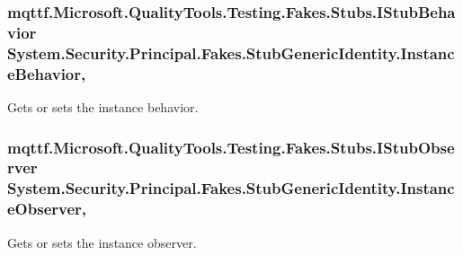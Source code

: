 \hypertarget{class_system_1_1_security_1_1_principal_1_1_fakes_1_1_stub_generic_identity_aebfe31f6715669121785a6d5a100efd6}{
\subsubsection[{Instance\-Behavior}]{\setlength{\rightskip}{0pt plus 5cm}mqttf.\-Microsoft.\-Quality\-Tools.\-Testing.\-Fakes.\-Stubs.\-I\-Stub\-Behavior System.\-Security.\-Principal.\-Fakes.\-Stub\-Generic\-Identity.\-Instance\-Behavior\hspace{0.3cm}{\ttfamily [get]}, {\ttfamily [set]}}}\label{class_system_1_1_security_1_1_principal_1_1_fakes_1_1_stub_generic_identity_aebfe31f6715669121785a6d5a100efd6}


Gets or sets the instance behavior.

\hypertarget{class_system_1_1_security_1_1_principal_1_1_fakes_1_1_stub_generic_identity_a7b144995e36a4b344bdf80cd566a4c0b}{
\subsubsection[{Instance\-Observer}]{\setlength{\rightskip}{0pt plus 5cm}mqttf.\-Microsoft.\-Quality\-Tools.\-Testing.\-Fakes.\-Stubs.\-I\-Stub\-Observer System.\-Security.\-Principal.\-Fakes.\-Stub\-Generic\-Identity.\-Instance\-Observer\hspace{0.3cm}{\ttfamily [get]}, {\ttfamily [set]}}}\label{class_system_1_1_security_1_1_principal_1_1_fakes_1_1_stub_generic_identity_a7b144995e36a4b344bdf80cd566a4c0b}


Gets or sets the instance observer.

